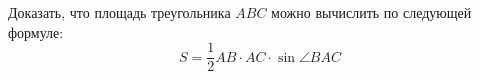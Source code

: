 \begin{ex}
	\begin{condition}
		Доказать, что площадь треугольника \( ABC \) можно вычислить по следующей формуле: \[ S = \dfrac{1}{2}AB\cdot AC \cdot \sin \angle BAC \]
	\end{condition}
\end{ex}